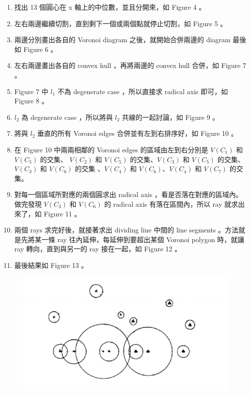\documentclass[12pt]{article}
\begin{document}
\begin{CJK}{UTF8}{bkai}
\begin{enumerate}
\item 找出 13 個圓心在 x 軸上的中位數，並且分開來，如 Figure 4 。
\item 左右兩邊繼續切割，直到剩下一個或兩個點就停止切割，如 Figure 5 。
\item 兩邊分別畫出各自的 Voronoi diagram 之後，就開始合併兩邊的 diagram
最後如 Figure 6 。
\item 左右兩邊畫出各自的 convex hull ，再將兩邊的 convex hull 合併，如 Figure 7 。
\item Figure 7 中 $l_1$ 不為 degenerate case ，所以直接求 radical axis 即可，如
 Figure 8 。
\item $l_2$ 為 degenerate case ，所以將與 $l_2$ 共線的一起討論，如 Figure 9 。
\item 將與 $l_2$ 垂直的所有 Voronoi edges 合併並有左到右排序好，如 Figure 10 。
\item 在 Figure 10 中兩兩相鄰的 Voronoi edges 的區域由左到右分別是 $V(C_1)$ 和 $V(C_5)$ 的交集、
 $V(C_2)$ 和 $V(C_5)$ 的交集、$V(C_3)$ 和 $V(C_5)$ 的交集、 $V(C_3)$ 和 $V(C_6)$ 的交集
、$V(C_4)$ 和 $V(C_6)$、$V(C_4)$ 和 $V(C_7)$ 的交集。
\item 對每一個區域所對應的兩個圓求出 radical axis ，看是否落在對應的區域內。做完發現
 $V(C_3)$ 和 $V(C_6)$ 的 radical axis 有落在區間內，所以 ray 就求出來了，如 Figure 11 。
\item 兩個 rays 求完好後，就接著求出 dividing line 中間的 line segments 。方法就是先將某一條
 ray 往內延伸，每延伸到要超出某個 Voronoi polygon 時，就讓 ray 轉向，直到與另一的 ray 接在一起，如 Figure 12 。
\item 最後結果如 Figure 13 。

\end{enumerate}

\begin{figure}[h]
\includegraphics[scale=0.4]{figure3.eps}
\caption{}
\end{figure}


\end{CJK}
\end{document}
